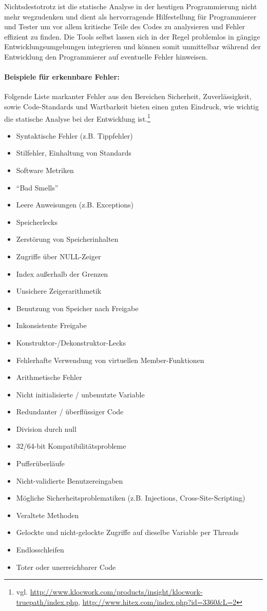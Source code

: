 Nichtsdestotrotz ist die statische Analyse in der heutigen Programmierung nicht mehr wegzudenken und dient als hervorragende Hilfestellung für Programmierer und Tester um vor allem kritische Teile des Codes zu analysieren und Fehler effizient zu finden.
Die Tools selbst lassen sich in der Regel problemlos in gängige Entwicklungsumgebungen integrieren und können somit unmittelbar während der Entwicklung den Programmierer auf eventuelle Fehler hinweisen.

\paragraph{Beispiele für erkennbare Fehler:}
Folgende Liste markanter Fehler aus den Bereichen Sicherheit, Zuverlässigkeit, sowie Code-Standards und Wartbarkeit bieten einen guten Eindruck, wie wichtig die statische Analyse bei der Entwicklung ist.\footnote{vgl. \url{http://www.klocwork.com/products/insight/klocwork-truepath/index.php}, \url{http://www.hitex.com/index.php?id=3360&L=2}}
\begin{itemize}
\item Syntaktische Fehler (z.B. Tippfehler)
\item Stilfehler, Einhaltung von Standards
\item Software Metriken
\item ``Bad Smells''
\item Leere Anweisungen (z.B. Exceptions)
\item Speicherlecks
\item Zerstörung von Speicherinhalten
\item Zugriffe über NULL-Zeiger
\item Index außerhalb der Grenzen
\item Unsichere Zeigerarithmetik
\item Benutzung von Speicher nach Freigabe
\item Inkonsistente Freigabe
\item Konstruktor-/Dekonstruktor-Lecks
\item Fehlerhafte Verwendung von virtuellen Member-Funktionen
\item Arithmetische Fehler
\item Nicht initialisierte / unbenutzte Variable
\item Redundanter / überflüssiger Code
\item Division durch null
\item 32/64-bit Kompatibilitätsprobleme
\item Pufferüberläufe
\item Nicht-validierte Benutzereingaben
\item Mögliche Sicherheitsproblematiken (z.B. Injections, Cross-Site-Scripting)
\item Veraltete Methoden
\item Gelockte und nicht-gelockte Zugriffe auf dieselbe Variable per Threads
\item Endlosschleifen
\item Toter oder unerreichbarer Code
\end{itemize}

